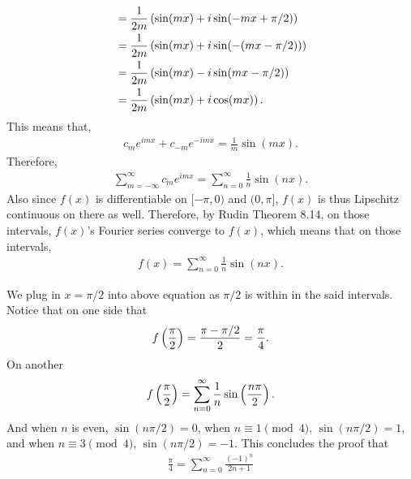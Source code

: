 \documentclass[12pt]{article}
\begin{document}
\begin{fproof}[3(a)]
\begin{align*}
   &=\frac{1}{2m} \left( \sin(mx) + i\sin(-mx + \pi/2) \right)\\
   &= \frac{1}{2m} \left( \sin(mx) + i\sin(-(mx - \pi/2)) \right)\\
   &=\frac{1}{2m} \left( \sin(mx) - i\sin(mx - \pi/2) \right)\\
   &=\frac{1}{2m} \left( \sin(mx) + i\cos(mx) \right).
 \end{align*}
 This means that,
 \begin{align*}
   c_m e^{imx} + c_{-m}e^{-imx} = \frac{1}{m} \sin(mx).
 \end{align*}
 Therefore,
 \begin{align*}
   \sum_{m = -\infty}^{\infty} c_m e^{imx} = \sum_{n=0}^{\infty} \frac{1}{n} \sin(nx).
 \end{align*}
 Also since \(f(x)\) is differentiable on \([-\pi, 0)\) and \((0, \pi]\), \(f(x)\) is thus Lipschitz continuous on there as well.
 Therefore, by Rudin Theorem 8.14, on those intervals, \(f(x)\)'s Fourier series converge to \(f(x)\), which means that on those intervals,
 \begin{align*}
   f(x) = \sum_{n=0}^{\infty} \frac{1}{n} \sin(nx).
 \end{align*}

\end{fproof}

\begin{fproof}[3(b)]
 We plug in \(x = \pi/2\) into above equation as \(\pi/2\) is within in the said intervals.
 Notice that on one side that
 \begin{align*}
   f\left( \frac{\pi}{2} \right) = \frac{\pi - \pi/2}{2} = \frac{\pi}{4}.
 \end{align*}
 On another 
 \begin{align*}
   f \left( \frac{\pi}{2} \right) = \sum_{n=0}^{\infty} \frac{1}{n} \sin \left( \frac{n \pi}{2} \right).
 \end{align*}
 And when \(n\) is even, \(\sin(n\pi/2) = 0\), when \(n \equiv 1 \pmod 4\), \(\sin(n\pi/2) = 1\), and when \(n \equiv 3 \pmod 4\), \(\sin(n\pi/2) = -1\).
 This concludes the proof that
 \begin{align*}
   \frac{\pi}{4} = \sum_{n=0}^{\infty} \frac{(-1)^n}{2n+1}
 \end{align*}
\end{fproof}
\end{document}
